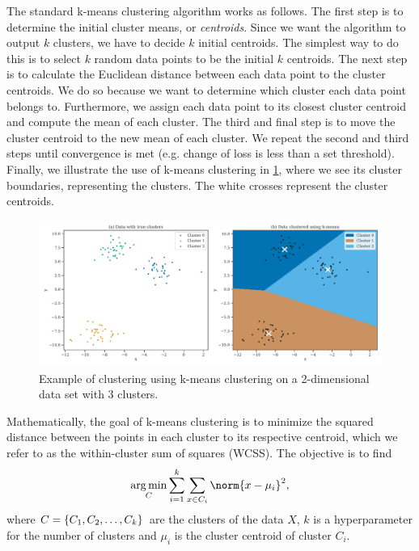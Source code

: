 The standard k-means clustering algorithm works as follows. The first step is to determine the initial cluster means, or \textit{centroids}. Since we want the algorithm to output $k$ clusters, we have to decide $k$ initial centroids. The simplest way to do this is to select $k$ random data points to be the initial $k$ centroids. The next step is to calculate the Euclidean distance between each data point to the cluster centroids. We do so because we want to determine which cluster each data point belongs to. Furthermore, we assign each data point to its closest cluster centroid and compute the mean of each cluster. The third and final step is to move the cluster centroid to the new mean of each cluster. We repeat the second and third steps until convergence is met (e.g. change of loss is less than a set threshold). Finally, we illustrate the use of k-means clustering in \cref{fig:k-means-clustering-2d-example}, where we see its cluster boundaries, representing the clusters. The white crosses represent the cluster centroids.
\begin{figure}[H]
    \centering
    \includegraphics[width=\textwidth]{thesis/figures/k-means-clustering-2d-example.pdf}
    \caption{Example of clustering using k-means clustering on a 2-dimensional data set with 3 clusters.}
    \label{fig:k-means-clustering-2d-example}
\end{figure}

Mathematically, the goal of k-means clustering is to minimize the squared distance between the points in each cluster to its respective centroid, which we refer to as the within-cluster sum of squares (WCSS). The objective is to find
\begin{align}
    \argmin_{C} \sumlim{i=1}{k} \sumlim{x \in C_i}{} \norm{x - \mu_i}^2,
\end{align}
where $C = \left\{C_1, C_2, \ldots, C_k\right\}$ are the clusters of the data $X$, $k$ is a hyperparameter for the number of clusters and $\mu_i$ is the cluster centroid of cluster $C_i$.

